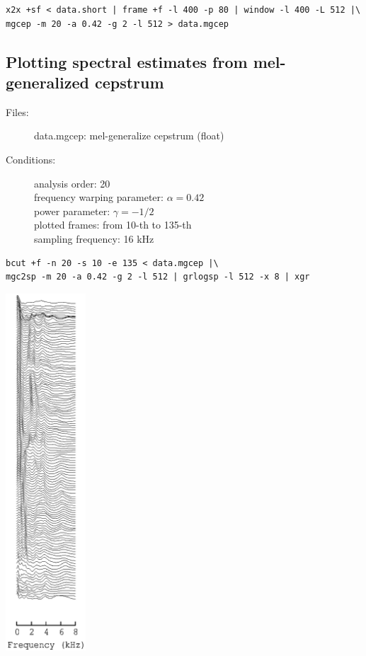 \documentclass[a4paper,10pt]{article}
\begin{document}
\begin{verbatim}
x2x +sf < data.short | frame +f -l 400 -p 80 | window -l 400 -L 512 |\
mgcep -m 20 -a 0.42 -g 2 -l 512 > data.mgcep
\end{verbatim}

\subsection{Plotting spectral estimates from mel-generalized cepstrum}

\begin{description}
\item[Files:]
  data.mgcep: mel-generalize cepstrum (float)
\item[Conditions:]
  analysis order: 20\\
  frequency warping parameter: $\alpha = 0.42$\\
  power parameter: $\gamma = -1/2$\\
  plotted frames: from 10-th to 135-th\\
  sampling frequency: 16 kHz
\end{description}

\begin{verbatim}
bcut +f -n 20 -s 10 -e 135 < data.mgcep |\
mgc2sp -m 20 -a 0.42 -g 2 -l 512 | grlogsp -l 512 -x 8 | xgr
\end{verbatim}

\includegraphics[width=3cm]{eps/data.mgcep.grlogsp.eps}
\end{document}
